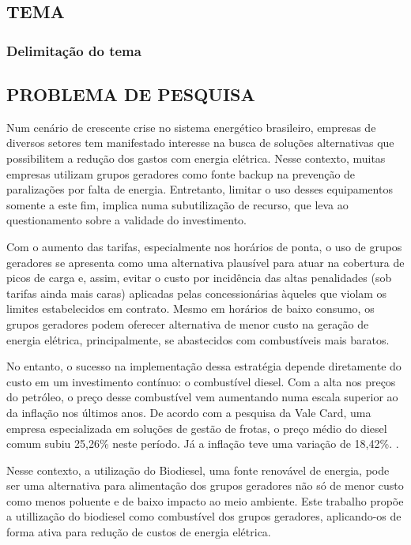 \subsection{TEMA}
\subsubsection{Delimitação do tema}

\subsection{PROBLEMA DE PESQUISA}

    \hspace{0.8cm}Num cenário de crescente crise no sistema energético brasileiro, empresas de diversos setores tem manifestado interesse na busca de soluções alternativas que possibilitem a redução dos gastos com energia elétrica. Nesse contexto, muitas empresas utilizam grupos geradores como fonte backup na prevenção de paralizações por falta de energia. Entretanto, limitar o uso desses equipamentos somente a este fim, implica numa subutilização de recurso, que leva ao questionamento sobre a validade do investimento. 
    
    Com o aumento das tarifas, especialmente nos horários de ponta, o uso de grupos geradores se apresenta como uma alternativa plausível para atuar na cobertura de picos de carga e, assim, evitar o custo por incidência das altas penalidades (sob tarifas ainda mais caras) aplicadas pelas concessionárias àqueles que violam os limites estabelecidos em contrato. Mesmo em horários de baixo consumo, os grupos geradores podem oferecer alternativa de menor custo na geração de energia elétrica, principalmente, se abastecidos com combustíveis mais baratos.
    
    No entanto, o sucesso na implementação dessa estratégia depende diretamente do custo em um investimento contínuo: o combustível diesel. Com a alta nos preços do petróleo, o preço desse combustível vem aumentando numa escala superior ao da inflação nos últimos anos. De acordo com a pesquisa da Vale Card, uma empresa especializada em soluções de gestão de frotas, o preço médio do diesel comum subiu 25,26\% neste período. Já a inflação teve uma variação de 18,42\%. \cite{janone}. 
    
    Nesse contexto, a utilização do Biodiesel, uma fonte renovável de energia, pode ser uma alternativa para alimentação dos grupos geradores não só de menor custo como menos poluente e de baixo impacto ao meio ambiente. Este trabalho propõe a utillização do biodiesel como combustível dos grupos geradores, aplicando-os de forma ativa para redução de custos de energia elétrica.


